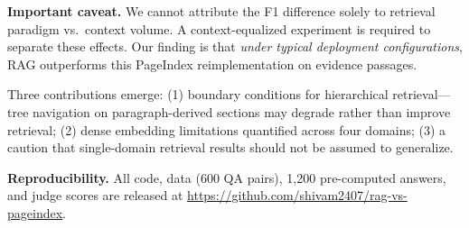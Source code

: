 \documentclass[journal]{IEEEtran}
\begin{document}
\textbf{Important caveat.} We cannot attribute the F1 difference solely to retrieval paradigm vs.\ context volume. A context-equalized experiment is required to separate these effects. Our finding is that \emph{under typical deployment configurations}, RAG outperforms this PageIndex reimplementation on evidence passages.

Three contributions emerge: (1) boundary conditions for hierarchical retrieval---tree navigation on paragraph-derived sections may degrade rather than improve retrieval; (2) dense embedding limitations quantified across four domains; (3) a caution that single-domain retrieval results should not be assumed to generalize.

\textbf{Reproducibility.} All code, data (600 QA pairs), 1,200 pre-computed answers, and judge scores are released at \url{https://github.com/shivam2407/rag-vs-pageindex}.
\end{document}
